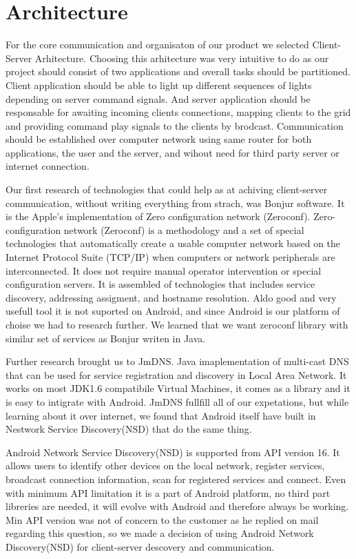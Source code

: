 \section{Architecture}

For the core communication and organisaton of our product we selected Client-Server Arhitecture.
Choosing this arhitecture was very intuitive to do as our project should consist of two applications and overall tasks should be partitioned. 
Client application should be able to light up different sequences of lights depending on server command signals.
And server application should be responsable for awaiting incoming clients connections, mapping clients to the grid and providing command play signals to the clients by brodcast.
Communication should be established over computer network using same router for both applications, the user and the server, and wihout need for third party server or internet connection. 


Our first research of technologies that could help as at achiving client-server communication, without writing everything from strach, was Bonjur software. 
It is the Apple's implementation of Zero configuration network (Zeroconf). 
Zero-configuration network (Zeroconf)  is a methodology and a set of special technologies that automatically create a usable computer network based on the Internet Protocol Suite (TCP/IP) when computers or network peripherals are interconnected. 
It does not require manual operator intervention or special configuration servers.
It is assembled of technologies that includes service discovery, addressing assigment, and hostname resolution.
Aldo good and very usefull tool it is not suported on Android, and since Android is our platform of choise we had to research further. 
We learned that we want zeroconf library with similar set of services as Bonjur writen in Java.


Further research brought us to JmDNS. Java imaplementation of multi-cast DNS that can be used for service registration and discovery in Local Area Network. 
It works on most JDK1.6 compatibile Virtual Machines, it comes as a library and it is easy to intigrate with Android. 
JmDNS fullfill all of our expetations, but while learning about it over internet, we found that Android itself have built in Nestwork Service Discovery(NSD) that do the same thing.


Android Network Service Discovery(NSD) is supported from API version 16. 
It allows users to identify other devices on the local network, register services, broadcast connection information, scan for registered services and connect.
Even with minimum API limitation it is a part of Android platform, no third part libreries are needed, it will evolve with Android and therefore always be working.
Min API version was not of concern to the customer as he replied on mail regarding this question, so we made a decision of using Android Network Discovery(NSD) for client-server descovery and communication.

